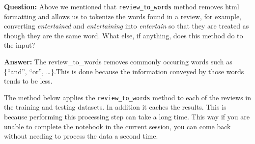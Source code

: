 \documentclass[11pt]{article}
\begin{document}
    \textbf{Question:} Above we mentioned that \texttt{review\_to\_words}
method removes html formatting and allows us to tokenize the words found
in a review, for example, converting \emph{entertained} and
\emph{entertaining} into \emph{entertain} so that they are treated as
though they are the same word. What else, if anything, does this method
do to the input?

    \textbf{Answer:} The review\_to\_words removes commonly occuring words
such as \{``and'', ``or'', \ldots{}\}.This is done because the
information conveyed by those words tends to be less.

    The method below applies the \texttt{review\_to\_words} method to each
of the reviews in the training and testing datasets. In addition it
caches the results. This is because performing this processing step can
take a long time. This way if you are unable to complete the notebook in
the current session, you can come back without needing to process the
data a second time.
\end{document}
